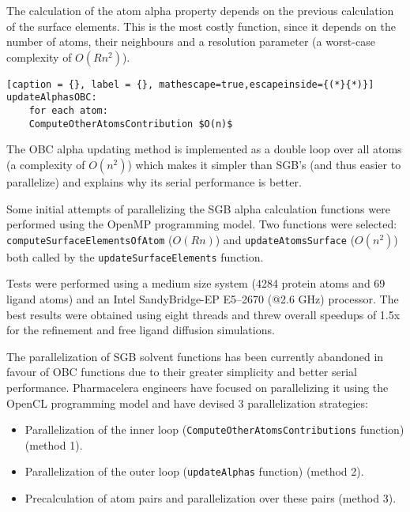 The calculation of the atom alpha property depends on the previous calculation of the surface elements. This is the most
costly function, since it depends  on the number of atoms, their neighbours and a resolution parameter (a worst-case complexity
of $O(R n^2)$).

\begin{lstlisting}[caption = {}, label = {}, mathescape=true,escapeinside={(*}{*)}]
updateAlphasOBC:
	for each atom:
	ComputeOtherAtomsContribution $O(n)$
\end{lstlisting}

The OBC alpha updating method is implemented as a double loop over all atoms (a complexity of $O(n^2)$) which makes
it simpler than SGB's (and thus easier to parallelize) and explains why its serial performance is better.


Some initial attempts of parallelizing the SGB alpha calculation functions were performed using the OpenMP programming model.
Two functions were selected: \texttt{computeSurfaceElementsOfAtom} ($O(R n)$) and \texttt{updateAtomsSurface} ($O(n^2)$) both called by
the \texttt{updateSurfaceElements} function. 

Tests were performed using a medium size system (4284 protein atoms and 69 ligand atoms) and an Intel SandyBridge-EP
E5--2670 (@2.6 GHz) processor. The best results were obtained using eight threads and threw overall speedups of \around1.5x for
the refinement and free ligand diffusion simulations. 


The parallelization of SGB solvent functions has been currently abandoned in favour of OBC functions due to their
greater simplicity and better serial performance. Pharmacelera engineers have focused on parallelizing it using the
OpenCL programming model and have devised 3 parallelization strategies:

\begin{itemize}
\item Parallelization of the inner loop (\texttt{ComputeOtherAtomsContributions} function) (method 1).
\item Parallelization of the outer loop (\texttt{updateAlphas} function) (method 2).
\item Precalculation of atom pairs and parallelization over these pairs (method 3).
\end{itemize}

